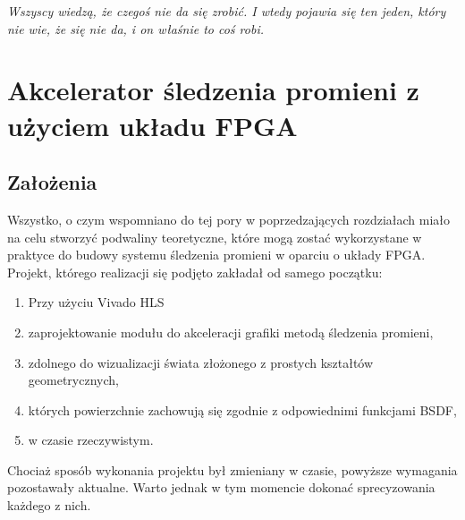 \begin{savequote}[1\textwidth]
\begin{flushright} 
\begin{minipage}[!h]{9.8cm}
{\itshape {Wszyscy wiedzą, że czegoś nie da się zrobić. I wtedy pojawia się ten jeden, który nie wie, że się nie da, i on właśnie to coś robi.}}
\end{minipage}
\end{flushright} 
\end{savequote}

\chapter{Akcelerator śledzenia promieni z użyciem układu FPGA}




\section{Założenia}
Wszystko, o czym wspomniano do tej pory w poprzedzających rozdziałach miało na celu stworzyć podwaliny teoretyczne, które mogą zostać wykorzystane w praktyce do budowy systemu śledzenia promieni w oparciu o układy FPGA. Projekt, którego realizacji się podjęto zakładał od samego początku:
\begin{enumerate}
\item Przy użyciu Vivado HLS
\item zaprojektowanie modułu do akceleracji grafiki metodą śledzenia promieni,
\item zdolnego do wizualizacji świata złożonego z prostych kształtów geometrycznych,
\item których powierzchnie zachowują się zgodnie z odpowiednimi funkcjami BSDF,
\item w czasie rzeczywistym.
\end{enumerate}

Chociaż sposób wykonania projektu był zmieniany w czasie, powyższe wymagania pozostawały aktualne. Warto jednak w tym momencie dokonać sprecyzowania każdego z nich.

